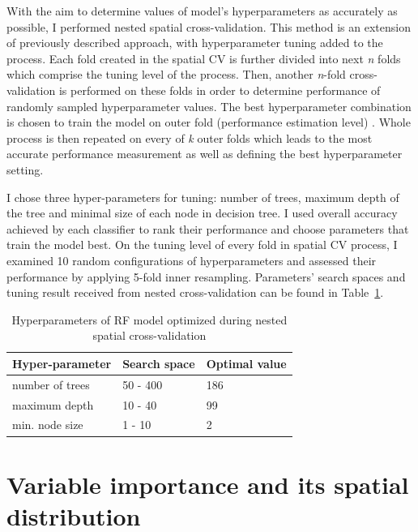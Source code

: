 \documentclass{amuthesis}
\begin{document}
With the aim to determine values of model's hyperparameters as
accurately as possible, I performed nested spatial cross-validation.
This method is an extension of previously described approach, with
hyperparameter tuning added to the process. Each fold created in the
spatial CV is further divided into next \emph{n} folds which comprise
the tuning level of the process. Then, another \emph{n}-fold
cross-validation is performed on these folds in order to determine
performance of randomly sampled hyperparameter values. The best
hyperparameter combination is chosen to train the model on outer fold
(performance estimation level) \autocite{schratz_hyperparameter_2019}.
Whole process is then repeated on every of \emph{k} outer folds which
leads to the most accurate performance measurement as well as defining
the best hyperparameter setting.

I chose three hyper-parameters for tuning: number of trees, maximum
depth of the tree and minimal size of each node in decision tree. I used
overall accuracy achieved by each classifier to rank their performance
and choose parameters that train the model best. On the tuning level of
every fold in spatial CV process, I examined 10 random configurations of
hyperparameters and assessed their performance by applying 5-fold inner
resampling. Parameters' search spaces and tuning result received from
nested cross-validation can be found in Table~\ref{tbl-tabela3}.

\hypertarget{tbl-tabela3}{}
\begin{table}
\caption{\label{tbl-tabela3}Hyperparameters of RF model optimized during nested spatial
cross-validation }\tabularnewline

\centering
\begin{tabular}{|>{}l|>{}l|>{}l|}
\toprule
\textbf{Hyper-parameter} & \textbf{Search space} & \textbf{Optimal value}\\
\midrule
number of trees & 50 - 400 & 186\\
\hline
maximum depth & 10 - 40 & 99\\
\hline
min. node size & 1 - 10 & 2\\
\bottomrule
\end{tabular}
\end{table}

\newpage

\hypertarget{sec-importance}{%
\section{Variable importance and its spatial
distribution}\label{sec-importance}}
\end{document}
